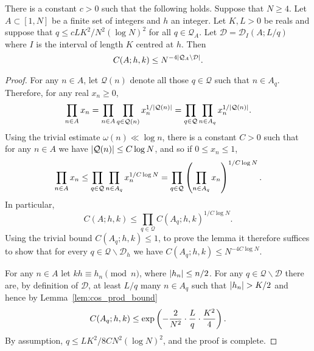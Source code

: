 \begin{lemma}\label{lem:minor2_ind_bound}
There is a constant $c>0$ such that the following holds.
Suppose that $N\geq 4$. Let $A\subset [1,N]$ be a finite set of integers and $h$ an integer. Let $K,L>0$ be reals and suppose that $q\leq cLK^2/N^2(\log N)^2$ for all $q\in \mathcal{Q}_A$. Let $\mathcal{D}=\mathcal{D}_I(A;L/q)$ where $I$ is the interval of length $K$ centred at $h$. Then
\[C(A;h,k)\leq N^{-4\left\lvert \mathcal{Q}_A\backslash\mathcal{D}\right\rvert}.\]
\end{lemma}
\begin{proof}
For any $n\in A$, let $\mathcal{Q}(n)$ denote all those $q\in \mathcal{Q}$ such that $n\in A_q$. Therefore, for any real $x_n\geq 0$,
\[\prod_{n\in A}x_n=\prod_{n\in A}\prod_{q\in \mathcal{Q}(n)}x_n^{1/\left\lvert \mathcal{Q}(n)\right\rvert}
=\prod_{q\in\mathcal{Q}}\prod_{n\in A_q}x_n^{1/\left\lvert \mathcal{Q}(n)\right\rvert}.\]
Using the trivial estimate $\omega(n)\ll \log n$, there is a constant $C>0$ such that for any $n\in A$ we have $\left\lvert \mathcal{Q}(n)\right\rvert\leq C\log N$, and so if $0\leq x_n\leq 1$,
\[\prod_{n\in A}x_n\leq \prod_{q\in\mathcal{Q}}\prod_{n\in A_q}x_n^{1/C\log N}=\prod_{q\in \mathcal{Q}}\left( \prod_{n\in A_q}x_n\right)^{1/C\log N}.\]
In particular,
 \[C(A;h,k)\leq \prod_{q\in \mathcal{Q}}C(A_q;h,k)^{1/C\log N}.\]
 Using the trivial bound $C(A_q;h,k)\leq 1$, to prove the lemma it therefore suffices to show that for every $q\in\mathcal{Q}\backslash\mathcal{D}_h$ we have $C(A_q;h,k)\leq N^{-4C\log N}$.

For any $n\in A$ let $kh\equiv h_n\pmod{n}$, where $\left\lvert h_n\right\rvert\leq n/2$. For any $q\in\mathcal{Q}\backslash \mathcal{D}$ there are, by definition of $\mathcal{D}$, at least $L/q$ many $n\in A_q$ such that $\left\lvert h_n\right\rvert>K/2$ and hence by Lemma~\ref{lem:cos_prod_bound}
\[C(A_q;h,k)\leq\exp\left( -\frac{2}{N^2}\cdot \frac{L}{q}\cdot \frac{K^2}{4}\right).\]
By assumption, $q\leq LK^2/8CN^2(\log N)^2$, and the proof is complete.
\end{proof}

